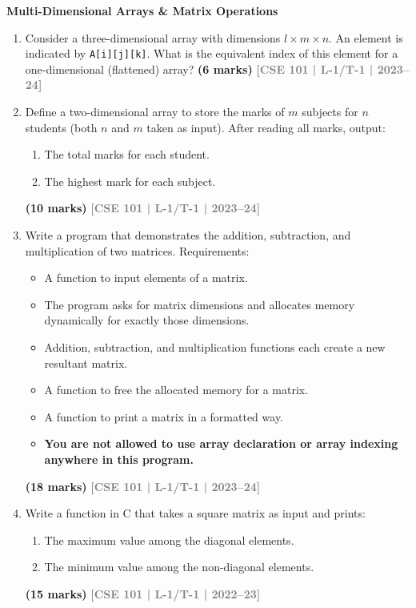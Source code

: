 \documentclass[12pt,a3paper]{article}
\newcommand{\yr}[1]{\hfill\textcolor{gray}{\small\textbf{[#1]}}}
\newcommand{\mk}[1]{\textcolor{orange!70!black}{\small\textbf{(#1 marks)}}}
\newcommand{\subtopic}[2]{%
  \vspace{10pt}
  \noindent\begin{tcolorbox}[colback=#1!8,colframe=#1,boxrule=0.6pt,arc=4pt,
    left=6pt,right=6pt,top=4pt,bottom=4pt]
    \small\bfseries\textcolor{#1}{#2}
  \end{tcolorbox}
  \vspace{2pt}
}
\begin{document}
\subtopic{cB}{Multi-Dimensional Arrays \& Matrix Operations}
\label{sub:s4-2darray}

\begin{enumerate}

\item Consider a three-dimensional array with dimensions $l \times m \times n$. An element is indicated by \texttt{A[i][j][k]}. What is the equivalent index of this element for a one-dimensional (flattened) array?
\mk{6} \yr{CSE 101 | L-1/T-1 | 2023--24}

\item Define a two-dimensional array to store the marks of $m$ subjects for $n$ students (both $n$ and $m$ taken as input). After reading all marks, output:
\begin{enumerate}
  \item The total marks for each student.
  \item The highest mark for each subject.
\end{enumerate}
\mk{10} \yr{CSE 101 | L-1/T-1 | 2023--24}

\item Write a program that demonstrates the addition, subtraction, and multiplication of two matrices. Requirements:
\begin{itemize}
  \item A function to input elements of a matrix.
  \item The program asks for matrix dimensions and allocates memory dynamically for exactly those dimensions.
  \item Addition, subtraction, and multiplication functions each create a new resultant matrix.
  \item A function to free the allocated memory for a matrix.
  \item A function to print a matrix in a formatted way.
  \item \textbf{You are not allowed to use array declaration or array indexing anywhere in this program.}
\end{itemize}
\mk{18} \yr{CSE 101 | L-1/T-1 | 2023--24}

\item Write a function in C that takes a square matrix as input and prints:
\begin{enumerate}
  \item The maximum value among the diagonal elements.
  \item The minimum value among the non-diagonal elements.
\end{enumerate}
\mk{15} \yr{CSE 101 | L-1/T-1 | 2022--23}


\end{enumerate}
\end{document}
